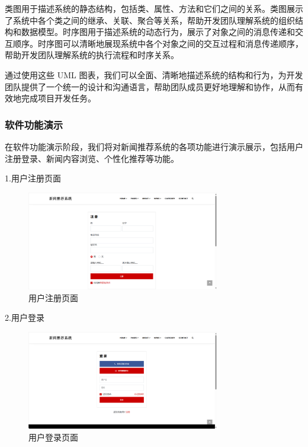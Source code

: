 \documentclass[withoutpreface,bwprint]{cumcmthesis} %
\begin{document}
	类图用于描述系统的静态结构，包括类、属性、方法和它们之间的关系。类图展示了系统中各个类之间的继承、关联、聚合等关系，帮助开发团队理解系统的组织结构和数据模型。时序图用于描述系统的动态行为，展示了对象之间的消息传递和交互顺序。时序图可以清晰地展现系统中各个对象之间的交互过程和消息传递顺序，帮助开发团队理解系统的执行流程和时序关系。\par
	通过使用这些 UML 图表，我们可以全面、清晰地描述系统的结构和行为，为开发团队提供了一个统一的设计和沟通语言，帮助团队成员更好地理解和协作，从而有效地完成项目开发任务。\par
	
	\subsubsection{ 软件功能演示}
	在软件功能演示阶段，我们将对新闻推荐系统的各项功能进行演示展示，包括用户注册登录、新闻内容浏览、个性化推荐等功能。\par
	1.用户注册页面\par
	\begin{figure}[H]
		\centering
		\includegraphics[width=0.75\textwidth]{用户注册页面}
		\caption{用户注册页面}
		\label{fig:circuit-diagcam}
	\end{figure}
	2.用户登录\par
	\begin{figure}[H]
		\centering
		\includegraphics[width=0.75\textwidth]{用户登录页面}
		\caption{用户登录页面}
		\label{fig:circuit-diagcam}
	\end{figure}
\end{document}
